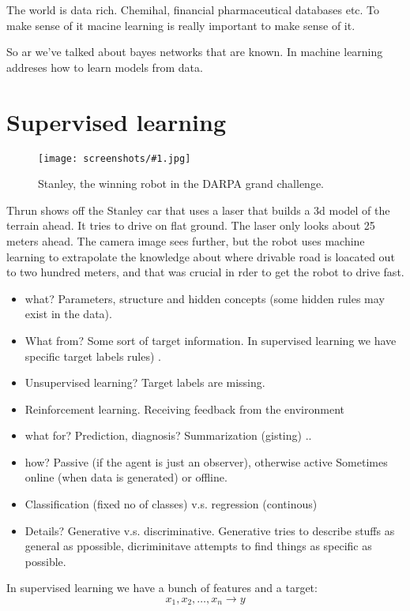 \documentclass[a4, 12pt, english, USenglish]{scrreprt}
\newcommand{\screenshot}[2]{
\begin{figure}[htb]
\texttt{[image: screenshots/\#1.jpg]}
\label{#1}
\caption{#2}
\end{figure}}
\begin{document}
The world is data rich.  Chemihal, financial pharmaceutical databases
etc.  To make sense of it macine learning is really important to make
sense of it.

So ar we've talked about bayes networks that are known.  In machine
learning addreses how to learn models from data.  

\section{Supervised learning}

\screenshot{stanley}{Stanley, the winning robot in the DARPA
  grand challenge.}

Thrun shows off the Stanley car  that uses a laser that builds a 3d
model of the terrain ahead.    It tries to drive on flat ground.  The
laser only looks about 25 meters ahead.   The camera image sees
further, but the robot uses machine learning to extrapolate the
knowledge about where drivable road is loacated out to two hundred
meters, and that was crucial in rder to get the robot to drive fast.

\begin{itemize}

\item what?  Parameters, structure and hidden concepts (some hidden
 rules may exist in the data).

\item What from?   Some sort of target information. In supervised
  learning we have specific target labels
  rules) .
\item  Unsupervised learning? Target labels are missing.
\item Reinforcement learning.   Receiving feedback from the
  environment
\item what for? Prediction, diagnosis? Summarization (gisting) ..
\item how? Passive (if the agent is just an observer), otherwise
  active   Sometimes online (when data is generated) or offline.
\item Classification (fixed no of classes) v.s. regression (continous)
\item Details?  Generative v.s. discriminative.  Generative tries to
          describe stuffs as general as ppossible, dicriminitave 
          attempts to find things as specific as possible.
\end{itemize}

In supervised learning we have a bunch of features and a target:
\[
   x_1, x_2, \ldots , x_n \rightarrow y
\]
\end{document}
